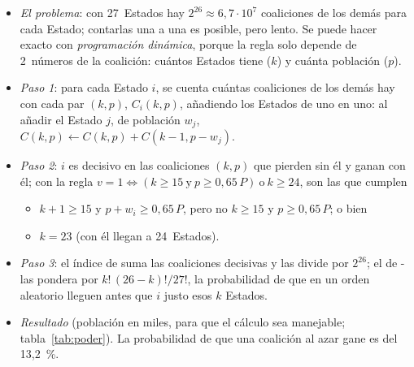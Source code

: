 \documentclass[11pt]{article}
\begin{document}
\begin{itemize}
\item \emph{El problema}: con 27~Estados hay $2^{26}\approx6{,}7\cdot10^{7}$ coaliciones de los demás para cada Estado; contarlas una a una es posible, pero lento. Se puede hacer exacto con \emph{programación dinámica}, porque la regla solo depende de 2~números de la coalición: cuántos Estados tiene ($k$) y cuánta población ($p$).
\item \emph{Paso 1}: para cada Estado $i$, se cuenta cuántas coaliciones de los demás hay con cada par $(k,p)$, $C_i(k,p)$, añadiendo los Estados de uno en uno: al añadir el Estado $j$, de población $w_j$, $C(k,p)\leftarrow C(k,p)+C(k-1,p-w_j)$.
\item \emph{Paso 2}: $i$ es decisivo en las coaliciones $(k,p)$ que pierden sin él y ganan con él; con la regla $v=1\iff(k\geq15\ \text{y}\ p\geq0{,}65\,P)\ \text{o}\ k\geq24$, son las que cumplen
  \begin{itemize}
  \item $k+1\geq15$ y $p+w_i\geq0{,}65\,P$, pero no $k\geq15$ y $p\geq0{,}65\,P$; o bien
  \item $k=23$ (con él llegan a 24~Estados).
  \end{itemize}
\item \emph{Paso 3}: el índice de  suma las coaliciones decisivas y las divide por $2^{26}$; el de - las pondera por $k!\,(26-k)!/27!$, la probabilidad de que en un orden aleatorio lleguen antes que $i$ justo esos $k$ Estados.
\item \emph{Resultado} (población en miles, para que el cálculo sea manejable; tabla~\ref{tab:poder}). La probabilidad de que una coalición al azar gane es del 13,2~\%.\findemo
\end{itemize}
\end{document}
